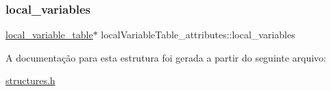 \subsubsection{\texorpdfstring{local\+\_\+variables}{local\_variables}}
{\footnotesize\ttfamily \hyperlink{structlocal__variable__table}{local\+\_\+variable\+\_\+table}$\ast$ local\+Variable\+Table\+\_\+attributes\+::local\+\_\+variables}



A documentação para esta estrutura foi gerada a partir do seguinte arquivo\+:\begin{DoxyCompactItemize}
\item 
\hyperlink{structures_8h}{structures.\+h}\end{DoxyCompactItemize}
